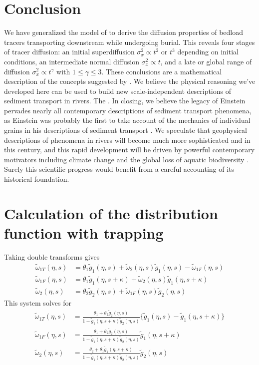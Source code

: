 \documentclass[]{agujournal2018}
\newcommand\tom{\tilde{\omega}}
\newcommand\tg{\tilde{g}}
\begin{document}
\section{Conclusion}
We have generalized the model of \citet{Einstein1937} to derive the diffusion properties of bedload tracers transporting downstream while undergoing burial.
This reveals four stages of tracer diffusion: an initial superdiffusion $\sigma_x^2 \propto t^2$ or $t^3$ depending on initial conditions, an intermediate normal diffusion $\sigma_x^2 \propto t$, and a late or global range of diffusion $\sigma_x^2 \propto t^\gamma$ with $1\leq \gamma \leq 3$.
These conclusions are a mathematical description of the concepts suggested by \citet{Nikora2001,Nikora2002}. 
We believe the physical reasoning we've developed here can be used to build new scale-independent descriptions of sediment transport in rivers.
The .
In closing, we believe the legacy of Einstein pervades nearly all contemporary descriptions of sediment transport phenomena, as Einstein was probably the first to take account of the mechanics of individual grains in his descriptions of sediment transport \citep{Einstein1937,Einstein1942,Einstein1950}.
We speculate that geophysical descriptions of phenomena in rivers will become much more sophisticated and  in this century, and this rapid development will be driven by powerful contemporary motivators including climate change \citep{Phillips2016} and the global loss of aquatic biodiversity \citep{Hauer2016}.
Surely this scientific progress would benefit from a careful accounting of its historical foundation.


\appendix

\section{Calculation of the distribution function with trapping}
\label{sec:appendix}
Taking double transforms gives
\begin{align}
\tom_{1T}(\eta,s) &= \theta_1 \tg_1(\eta,s) + \tom_2(\eta,s)\tg_1(\eta,s)-\tom_{1F}(\eta,s) \\
\tom_{1F}(\eta,s) &= \theta_1\tg_1(\eta,s+\kappa) + \tom_2(\eta,s)\tg_1(\eta,s+\kappa)\\
\tom_2(\eta,s) &= \theta_2 \tg_2(\eta,s) + \tom_{1F}(\eta,s)\tg_2(\eta,s)
\end{align}
This system solves for 
\begin{align}
\tom_{1T}(\eta,s) &= \frac{\theta_1 + \theta_2 \tg_2(\eta,s)}{1-\tg_1(\eta,s+\kappa)\tg_2(\eta,s)}\big\{\tg_1(\eta,s)-\tg_1(\eta,s+\kappa) \big\} \\
\tom_{1F}(\eta,s) &= \frac{\theta_1 + \theta_2 \tg_2(\eta,s)}{1-\tg_1(\eta,s+\kappa)\tg_2(\eta,s)}\tg_1(\eta,s+\kappa)\\
\tom_{2}(\eta,s) &= \frac{\theta_2 + \theta_1 \tg_1(\eta,s+\kappa)}{1-\tg_1(\eta,s+\kappa)\tg_2(\eta,s)}\tg_2(\eta,s)\\
\end{align}
\end{document}
